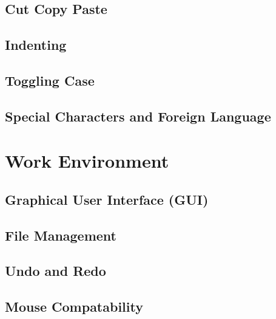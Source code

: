 \documentclass[12pt, oneside]{book}
\begin{document}
  \subsection{Cut Copy Paste}
  \subsection{Indenting}
  \subsection{Toggling Case}
  \subsection{Special Characters and Foreign Language}
\section{Work Environment}
  \subsection{Graphical User Interface (GUI)}
  \subsection{File Management}
  \subsection{Undo and Redo}
  \subsection{Mouse Compatability}
\end{document}
